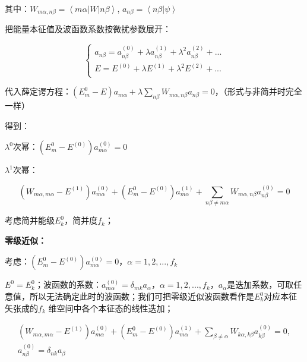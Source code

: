 其中：$W_{m\alpha ,n\beta }  = \left\langle {m\alpha } \right|W\left| {n\beta } \right\rangle $, $a_{n\beta }  = \left\langle {n\beta } \right|\left. \psi  \right\rangle $


把能量本征值及波函数系数按微扰参数展开：

\begin{equation}\label{22-21}
\left\{ \begin{array}{l}
 a_{n\beta }  = a_{n\beta }^{(0)}  + \lambda a_{n\beta }^{(1)}  + \lambda ^2 a_{n\beta }^{(2)}  + ... \\
 E = E^{(0)}  + \lambda E^{(1)}  + \lambda ^2 E^{(2)}  + ... \\
 \end{array} \right.
\end{equation}

代入薛定谔方程：$\left( {E_m^0  - E} \right)a_{m\alpha }  + \lambda \sum\limits_{n\beta } {W_{m\alpha ,n\beta } a_{n\beta } }  = 0$，（形式与非简并时完全一样）

得到：

$\lambda ^0 $次幂：$\left( {E_m^0  - E^{(0)} } \right)a_{m\alpha }^{(0)}  = 0$

$\lambda ^1 $次幂：

\begin{equation*} 
{\left( {W_{m\alpha ,m\alpha }  - E^{(1)} } \right)a_{m\alpha }^{(0)}  + \left( {E_m^0  - E^{(0)} } \right)a_{m\alpha }^{(1)}  + \sum\limits_{n\beta  \ne m\alpha } {W_{m\alpha ,n\beta } a_{n\beta }^{(0)} } }  = 0
\end{equation*}

考虑简并能级$E_k^0 $，简并度$f_k$；

\textbf{零级近似：}

考虑：$\left( {E_m^0  - E^{(0)} } \right)a_{m\alpha }^{(0)}  = 0$，$\alpha  = 1,2,...,f_k $


$E^0  = E_k^0 $；波函数的系数：$a_{m\alpha }^{(0)}  = \delta _{mk} a_\alpha  $，$\alpha  = 1,2,...,f_k $，$a_\alpha  $是迭加系数，可取任意值，所以无法确定此时的波函数；我们可把零级近似波函数看作是$E_k^0 $对应本征矢张成的$f_k$ 维空间中各个本征态的线性迭加；

\begin{equation}\label{22-22}
\begin{array}{l}
{\left( {W_{m\alpha ,m\alpha }  - E^{(1)} } \right)a_{m\alpha }^{(0)}  + \left( {E_m^0  - E^{(0)} } \right)a_{m\alpha }^{(1)}  + \sum\limits_{\beta  \ne \alpha } {W_{k\alpha ,k\beta } a_{k\beta }^{(0)} } } = 0,\\ 
a_{n\beta }^{(0)}  = \delta _{nk} a_\beta \\
\end{array}
\end{equation}

